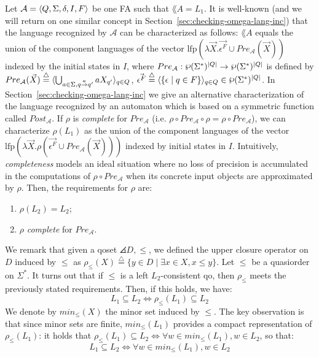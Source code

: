 Let $\mathcal{A}=\langle Q, \Sigma, \delta, I, F\rangle$ be one FA such that $\lang{A} = L_1$.
It is well-known (and we will return on one similar concept in Section~\ref{sec:checking-omega-lang-inc}) that the language recognized
by $\mathcal{A}$ can be characterized as follows:
$\lang{A}$ equals the union of the component languages of the vector $\textrm{lfp}  (\lambda \vec{X} .
        \vec{\epsilon^F} \cup Pre_{\mathcal{A}}(\vec{X}))$ indexed by the initial states in $I$, where
$Pre_{\mathcal{A}}: \powerset(\Sigma^*)^{|Q|} \rightarrow \powerset (\Sigma^*)^{|Q|}$
is defined by $Pre_{\mathcal{A}}(\vec{X}) \overset{\triangle}{=}
\langle \bigcup_{a \in \Sigma, q \overset{a}{\rightarrow} q'} a X_{q'} \rangle_{q \in Q}$,
$\vec{\epsilon^F} \overset{\triangle}{=}
\langle \{ \epsilon \;|\; q \in F\}\rangle_{q \in Q} \in \powerset(\Sigma^*)^{|Q|}$.
In Section~\ref{sec:checking-omega-lang-inc} we give an alternative characterization
of the language recognized by an automaton which is based on a symmetric function
called $Post_{\mathcal{A}}$.
If $\rho$ is \emph{complete} for $Pre_{\mathcal{A}}$
(i.e. $\rho \circ Pre_{\mathcal{A}} \circ \rho = \rho \circ Pre_{\mathcal{A}}$),
we can characterize $\rho(L_1)$ as the union of the component languages of the vector
$\textrm{lfp}  (\lambda \vec{X} . \rho(\vec{\epsilon^F} \cup Pre_{\mathcal{A}}(\vec{X})))$
indexed by initial states in $I$.
Intuitively, \emph{completeness} models an ideal situation where no loss of precision is
accumulated in the computations of $\rho \circ Pre_{\mathcal{A}}$ when its
concrete input objects are approximated by $\rho$.
Then, the requirements for $\rho$ are:
\begin{enumerate}
\item $\rho(L_2) = L_2$;
\item $\rho$ \emph{complete} for $Pre_{\mathcal{A}}$.
\end{enumerate}

We remark that given a qoset $\angles{D, \leq}$, we defined the upper closure operator
on $D$ induced by $\leq$ as
$\rho_{\leq}(X) \overset{\triangle}{=} \{ y \in D \;|\; \exists x \in X, x \leq y\}$.
Let $\leq$ be a quasiorder on $\Sigma^*$.
It turns out that if $\leq$ is a left $L_2$-consistent qo, then $\rho_{\leq}$ meets
the previously stated requirements.
Then, if this holds, we have:
\[ L_1 \subseteq L_2 \Longleftrightarrow \rho_{\leq}(L_1) \subseteq L_2 \]
We denote by $min_{\leq}(X)$ the minor set induced by $\leq$.
The key observation is that since minor sets are finite,
$min_{\leq}(L_1)$ provides a compact representation of $\rho_{\leq}(L_1)$:
it holds that $\rho_{\leq}(L_1) \subseteq L_2 \Longleftrightarrow \forall w \in min_{\leq}(L_1), w \in L_2$,
so that:
\[ L_1 \subseteq L_2 \Longleftrightarrow \forall w \in min_{\leq}(L_1), w \in L_2 \]

